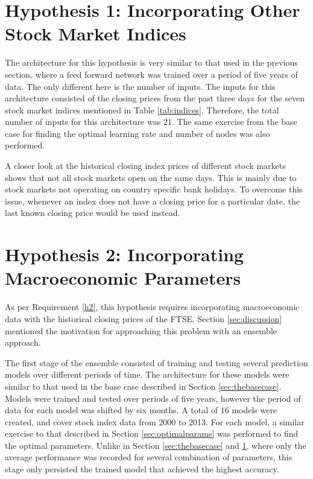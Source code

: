 \documentclass{UoYCSproject}
\begin{document}
\section{Hypothesis 1: Incorporating Other Stock Market Indices}
\label{sec:methodh1}
The architecture for this hypothesis is very similar to that used in the previous section, where a feed forward network was trained over a period of five years of data. The only different here is the number of inputs. The inputs for this architecture consisted of the closing prices from the past three days for the seven stock market indices mentioned in Table \ref{tab:indices}. Therefore, the total number of inputs for this architecture was $21$. The same exercise from the base case for finding the optimal learning rate and number of nodes was also performed. 

A closer look at the historical closing index prices of different stock markets shows that not all stock markets open on the same days. This is mainly due to stock markets not operating on country specific bank holidays. To overcome this issue, whenever an index does not have a closing price for a particular date, the last known closing price would be used instead.  

\section{Hypothesis 2: Incorporating Macroeconomic Parameters}
\label{sec:methodh2}
As per Requirement \ref{h2}, this hypothesis requires incorporating macroeconomic data with the historical closing prices of the FTSE. Section \ref{sec:discussion} mentioned the motivation for approaching this problem with an ensemble approach. 

The first stage of the ensemble consisted of training and testing several prediction models over different periods of time. The architecture for these models were similar to that used in the base case described in Section \ref{sec:thebasecase}. Models were trained and tested over periods of five years, however the period of data for each model was shifted by six months. A total of $16$ models were created, and cover stock index data from 2000 to 2013. For each model, a similar exercise to that described in Section \ref{sec:optimalparams} was performed to find the optimal parameters. Unlike in Section \ref{sec:thebasecase} and \ref{sec:methodh1}, where only the average performance was recorded for several combination of parameters, this stage only persisted the trained model that achieved the highest accuracy.  
\end{document}
